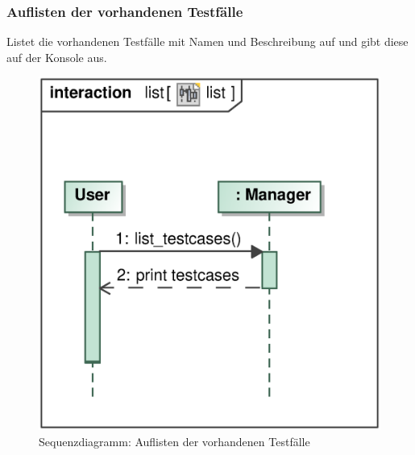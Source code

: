 \subsubsection{Auflisten der vorhandenen Testfälle} 
Listet die vorhandenen Testfälle mit Namen und Beschreibung auf und gibt diese auf der Konsole aus.
\begin{figure}[H]
    \myfloatalign
    \includegraphics[width=.65\textwidth]{gfx/MtGDeepAnalysis/cli_list.eps}
    \caption{Sequenzdiagramm: Auflisten der vorhandenen Testfälle}
    \label{fig:seq:list}
\end{figure}